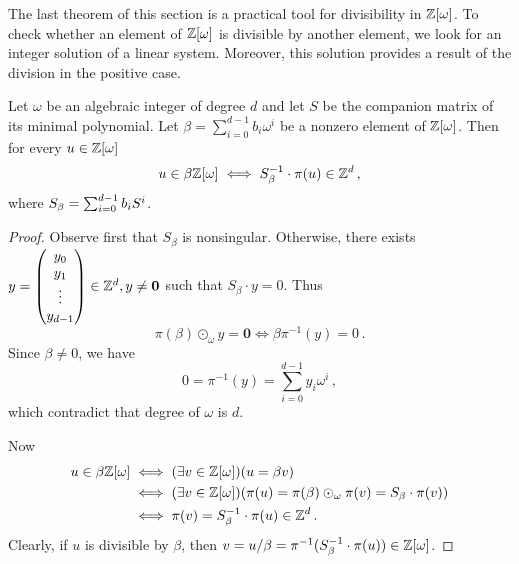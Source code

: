 The last theorem of this section is a practical tool for divisibility in $\mathbb{Z}[\omega]$. To check whether an element of $\mathbb{Z}[\omega]$ is divisible by another element, we look for an integer solution of a linear system. Moreover, this solution provides a result of the division in the positive case. 
\begin{theo}
\label{thm:divisibility}
Let $\omega$ be an algebraic integer of degree $d$ and let $S$ be the companion matrix of its minimal polynomial. Let $\beta=\sum_{i=0}^{d-1} b_i \omega^i$ be a nonzero element of $\mathbb{Z}[\omega]$. Then for every $u\in\mathbb{Z}[\omega]$
$$
u\in\beta\mathbb{Z}[\omega] \iff S_\beta^{-1}\cdot \pi(u) \in \mathbb{Z}^d\,,
$$
where $S_\beta=\sum_{i=0}^{d-1} {b}_i S^i$.
\end{theo}
\begin{proof}
Observe first that $S_\beta$ is nonsingular. Otherwise, there exists $y=\begin{pmatrix} {y}_0 \\ {y}_1 \\ \vdots \\ {y}_{d-1} \end{pmatrix} \in \mathbb{Z}^d, y\neq \mathbf{0}$ such that $S_\beta \cdot y=0$. Thus
$$
\pi(\beta)\odot_\omega y=\mathbf{0} \iff \beta \pi^{-1}(y)=0\,.
$$
Since $\beta\neq 0$, we have
$$
0=\pi^{-1}(y)=\sum_{i=0}^{d-1} y_i \omega^i\,,
$$
which contradict that degree of $\omega$ is $d$.

Now
\begin{align*}
u\in\beta\mathbb{Z}[\omega] &\iff (\exists v \in \mathbb{Z}[\omega])(u=\beta v)\\
    &\iff  (\exists v \in \mathbb{Z}[\omega])(\pi(u)=\pi(\beta)\odot_\omega\pi(v)=S_\beta \cdot \pi(v))\\
    &\iff \pi(v)=S_\beta^{-1} \cdot \pi(u) \in \mathbb{Z}^d\,.
\end{align*} 
Clearly, if $u$ is divisible by $\beta$, then $v=u/\beta= \pi^{-1}(S_\beta^{-1} \cdot \pi(u))\in\mathbb{Z}[\omega]$.
\end{proof}























  
   